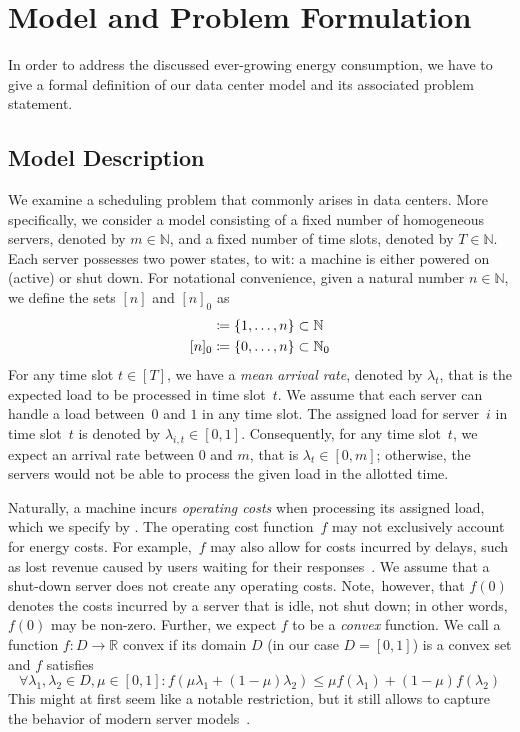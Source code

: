 
\chapter{Model and Problem Formulation}\label{chap:model_descr_problem_state}
In order to address the discussed ever-growing energy consumption, we have to give a formal definition of our data center model and its associated problem statement.

\section{Model Description}\label{sec:model_descr}
We examine a scheduling problem that commonly arises in data centers. More specifically, we consider a model consisting of a fixed number of homogeneous servers, denoted by $m\in\mathbb{N}$, and a fixed number of time slots, denoted by $T\in\mathbb{N}$. Each server possesses two power states, to wit: a machine is either powered on (active) or shut down. For notational convenience, given a natural number $n\in\mathbb{N}$, we define the sets $[n]$ and $[n]_0$ as
\begin{align*}
	[n]&\coloneqq\fromto{1}{n}\subset\mathbb{N}\\
	[n]_0&\coloneqq\fromto{0}{n}\subset\mathbb{N}_0
\end{align*}
For any time slot $t\in[T]$, we have a \emph{mean arrival rate}, denoted by $\lambda_t$, that is the expected load to be processed in time slot~$t$. We assume that each server can handle a load between~$0$ and $1$ in any time slot. The assigned load for server~$i$ in time slot~$t$ is denoted by $\lambda_{i,t}\in[0,1]$. Consequently, for any time slot~$t$, we expect an arrival rate between $0$ and $m$, that is $\lambda_t\in[0,m]$; otherwise, the servers would not be able to process the given load in the allotted time.

Naturally, a machine incurs \emph{operating costs} when processing its assigned load, which we specify by . The operating cost function~$f$ may not exclusively account for energy costs. For example,~$f$ may also allow for costs incurred by delays, such as lost revenue caused by users waiting for their responses~\parencite{dyn-right-sizing}\parencite{geo-load-balancing}. We assume that a shut-down server does not create any operating costs. Note,~however, that $f(0)$ denotes the costs incurred by a server that is idle, not shut down; in other words, $f(0)$ may be non-zero. Further, we expect $f$ to be a \emph{convex} function. We call a function $f:D\rightarrow\mathbb{R}$ convex if its domain $D$ (in our case $D=[0,1]$) is a convex set and $f$ satisfies
\begin{equation}\label{eq:convex_condition}
	\forall \lambda_1,\lambda_2\in D,\mu\in[0,1]:f(\mu\lambda_1+(1-\mu)\lambda_2)\le\mu f(\lambda_1)+(1-\mu)f(\lambda_2)
\end{equation}
This might at first seem like a notable restriction, but it still allows to capture the behavior of modern server models~\parencite{bansal-soco}\parencite{dyn-right-sizing}.

